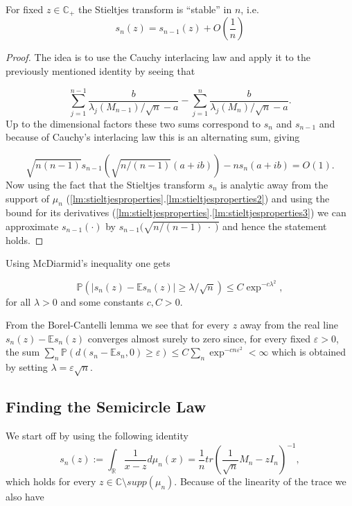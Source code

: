 \begin{lemma}
	For fixed $z\in\mathbb C_+$ the Stieltjes transform is ``stable'' in $n$, i.e.
	\begin{equation*}
		s_n(z)=s_{n-1}(z)+O\left(\frac{1}{n}\right)
	\end{equation*}
\end{lemma}
\begin{proof}
	The idea is to use the Cauchy interlacing law and apply it to the previously mentioned identity by seeing that
	
	$$\sum_{j=1}^{n-1}\frac{b}{\lambda_j(M_{n-1})/\sqrt{n}-a}-\sum_{j=1}^n\frac{b}{\lambda_j(M_n)/\sqrt{n}-a}.$$
	Up to the dimensional factors these two sums correspond to $s_n$ and $s_{n-1}$ and because of Cauchy's interlacing law this is an alternating sum, giving
	
	$$\sqrt{n(n-1)}s_{n-1}(\sqrt{n/(n-1)}(a+ib))-ns_n(a+ib)=O(1).$$
	Now using the fact that the Stieltjes transform $s_n$ is analytic away from the support of $\mu_n$ (\ref{lm:stieltjesproperties}.\ref{lm:stieltjesproperties2}) and using the bound for its derivatives (\ref{lm:stieltjesproperties}.\ref{lm:stieltjesproperties3}) we can approximate $s_{n-1}(\cdot)$ by $s_{n-1}(\sqrt{n/(n-1) \;\cdot\; )}$ and hence the statement holds.
\end{proof}

Using McDiarmid's inequality one gets 

\begin{equation}\label{eq:concentrationOfStieltjesTransform}
	\mathbb P(|s_n(z)-\mathbb Es_n(z)|\geq\lambda/\sqrt n)\leq C\exp^{-c\lambda^2},
\end{equation}
 for all $\lambda>0$ and some constants $c,C>0$.

From the Borel-Cantelli lemma we see that for every $z$ away from the real line $s_n(z)-\mathbb Es_n(z)$ converges almost surely to zero since, for every fixed $\varepsilon>0$, the sum $\sum_n \mathbb P(d(s_n-\mathbb Es_n,0)\geq\varepsilon) \leq C\sum_n\exp^{-cn\varepsilon^2}<\infty$ which is obtained by setting $\lambda=\varepsilon\sqrt n$.

\subsection{Finding the Semicircle Law}

We start off by using the following identity $$s_n(z) := \int_\mathbb{R}\frac{1}{x-z}d\mu_n(x) = \frac{1}{n}tr\left(\frac{1}{\sqrt n}M_n-zI_n\right)^{-1},$$ which holds for every $z\in\mathbb C\setminus supp(\mu_n)$. Because of the linearity of the trace we also have

